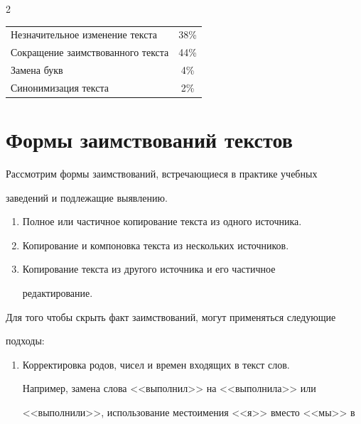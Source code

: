 \begin{multicols}{2}
\begin{table}
\begin{center}
\begin{tabular}{|l|c|}
Незначительное изменение текста&38\%\\

Сокращение заимствованного текста&44\%\\

Замена букв&\hphantom{9}4\%\\

Синонимизация текста&\hphantom{9}2\%\\

\hline

\end{tabular}

\end{center}

\end{table}



\section{Формы заимствований текстов}



  Рассмотрим формы заимствований, встре\-ча\-ющи\-еся в практике учебных 

заведений и подлежащие выявлению. 

  \begin{enumerate}[1.]

  \item Полное или частичное копирование текста из одного источника. 

  \item Копирование и компоновка текста из нескольких источников.

  \item Копирование текста из другого источника и его частичное 

редактирование.

  \end{enumerate}

  

  Для того чтобы скрыть факт заимствований, могут применяться следующие 

подходы:

  \begin{enumerate}[1.]

  \item Корректировка родов, чисел и времен входящих в текст слов. 

Например, замена слова <<выполнил>> на <<выполнила>> или 

<<выполнили>>, использование местоимения <<я>> вместо <<мы>> в 


\end{enumerate}
\end{multicols}
